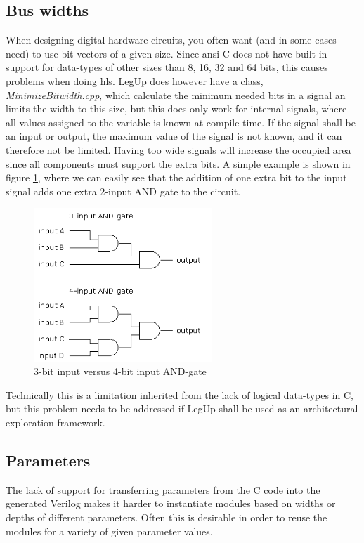 \subsection{Bus widths}
When designing digital hardware circuits, you often want (and in some cases need) to use bit-vectors of a given size. Since \gls{ansi}-C does not have built-in support for data-types of other sizes than 8, 16, 32 and 64 bits, this causes problems when doing \gls{hls}. LegUp does however have a class, \textit{MinimizeBitwidth.cpp}, which calculate the minimum needed bits in a signal an limits the width to this size, but this does only work for internal signals, where all values assigned to the variable is known at compile-time. If the signal shall be an input or output, the maximum value of the signal is not known, and it can therefore not be limited. Having too wide signals will increase the occupied area since all components must support the extra bits. A simple example is shown in figure \ref{fig:andgate34}, where we can easily see that the addition of one extra bit to the input signal adds one extra 2-input AND gate to the circuit.
\begin{figure}[hbpt]
\centering
\includegraphics[width=0.6\textwidth]{../figs/AndGate34Bit.png}
\caption{\label{fig:andgate34}3-bit input versus 4-bit input AND-gate}
\end{figure}
Technically this is a limitation inherited from the lack of logical data-types in C, but this problem needs to be addressed if LegUp shall be used as an architectural exploration framework.
\subsection{\label{subsec:parameterprobs}Parameters}
The lack of support for transferring parameters from the C code into the generated Verilog makes it harder to instantiate modules based on widths or depths of different parameters. Often this is desirable in order to reuse the modules for a variety of given parameter values.
